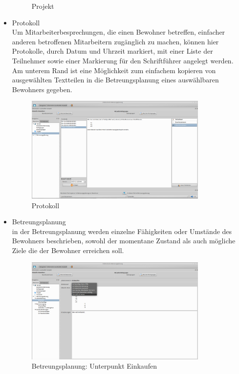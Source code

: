 \begin{itemize}
\begin{figure}[h!]
\begin{center}
			\caption{Projekt}
		\end{center}
	\end{figure}
	\FloatBarrier
	\newpage
	\item Protokoll\mbox{}\\
	\noindent
	Um Mitarbeiterbesprechungen, die einen Bewohner betreffen, einfacher anderen betroffenen Mitarbeitern zugänglich zu machen, können hier Protokolle, durch Datum und Uhrzeit markiert, mit einer Liste der Teilnehmer sowie einer Markierung für den Schriftführer angelegt werden.\\Am unterem Rand ist eine Möglichkeit zum einfachem kopieren von ausgewählten Textteilen in die Betreungsplanung eines auswählbaren Bewohners gegeben.
	\begin{figure}[h!]
		\begin{center}
			\includegraphics[keepaspectratio=true, width=0.85\textwidth]{pics/client_protokoll.png}
			\caption{Protokoll}
		\end{center}
	\end{figure}
	\FloatBarrier
	\newpage
	\item Betreungsplanung\mbox{}\\
	\noindent
	in der Betreungsplanung werden einzelne Fähigkeiten oder Umstände des Bewohners beschrieben, sowohl der momentane Zustand als auch mögliche Ziele die der Bewohner erreichen soll.
	\begin{figure}[h!]
		\begin{center}
			\includegraphics[keepaspectratio=true, width=0.85\textwidth]{pics/client_lebensfuehrung.png}
			\caption{Betreungsplanung: Unterpunkt Einkaufen}
		\end{center}
	\end{figure}
\end{itemize}
\newpage
